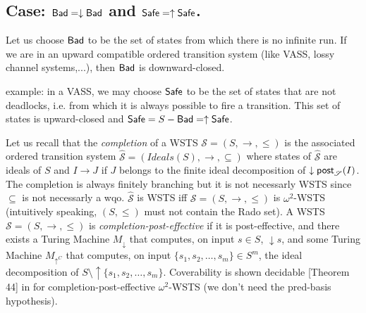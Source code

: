 




\subsection{Case: $\textsf{Bad}=\downarrow \textsf{Bad}$ and $\textsf{Safe}=\uparrow \textsf{Safe}$.}

%
%
Let us choose $\textsf{Bad}$ to be the set of states from which there is no infinite run. If we are in an upward compatible ordered transition system (like VASS, lossy channel systems,...), then $\textsf{Bad}$ is downward-closed.







example: in a VASS, we may choose $\textsf{Safe}$ to be the set of states that are not deadlocks, i.e. from which it is always possible to fire a transition. This set of states is upward-closed and $\textsf{Safe}=S-\textsf{Bad}=\uparrow \textsf{Safe}$.



%


%
Let us recall that the \emph{completion}  \cite{BFM-ic17} of a WSTS $\mathscr{S}=(S,\rightarrow, \leq)$ is the associated ordered transition system $\hat{\mathscr{S}}=(Ideals(S),\rightarrow, \subseteq)$ where states of $\hat{\mathscr{S}}$ are ideals of $S$ and $I \rightarrow J$ if $J$ belongs to the finite ideal decomposition of $\downarrow \textsf{post}_{\mathscr{S}}(I)$. The completion is always finitely branching but it is not necessarly WSTS since $\subseteq$ is not necessarly a wqo. $\hat{\mathscr{S}}$ is WSTS iff $\mathscr{S}=(S,\rightarrow, \leq)$ is $\omega^2$-WSTS (intuitively speaking, $(S,\leq)$ must not contain the Rado set). 
A WSTS $\mathscr{S}=(S,\rightarrow,\leq)$ is {\em completion-post-effective} if
it is post-effective, and there exists a Turing Machine $M_\downarrow$ that computes, on input $s \in S$, %
 $\downarrow s$, and some Turing Machine $M_{\uparrow^C}$ that computes, on input
 $\{s_1, s_2, \ldots, s_m\} \in S^m$, 
 the ideal decomposition of $S \setminus \uparrow \{ s_1, s_2, \ldots, s_m\}$.
Coverability is shown decidable  [Theorem 44] in \cite{BFM-ic17} for completion-post-effective $\omega^2$-WSTS (we don't need the pred-basis hypothesis).

